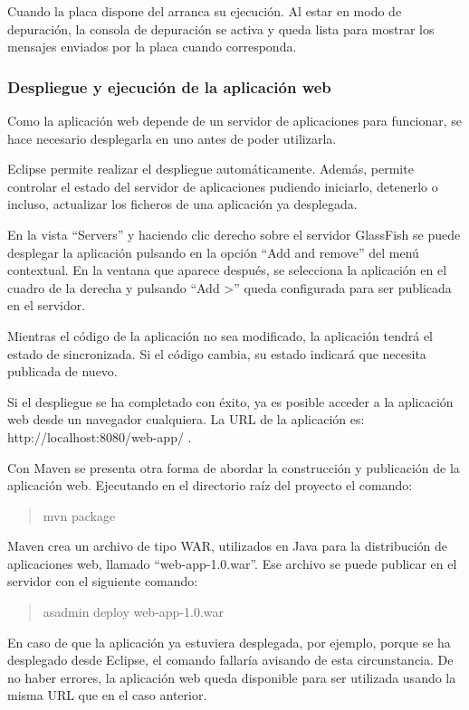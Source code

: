 Cuando la placa dispone del \sw{} arranca su ejecución. Al estar en modo de
depuración, la consola de depuración se activa y queda lista para mostrar los
mensajes enviados por la placa cuando corresponda.



\subsubsection{Despliegue y ejecución de la aplicación web} \label{sec:exe-aw}
Como la aplicación web depende de un servidor de aplicaciones para funcionar,
se hace necesario desplegarla en uno antes de poder utilizarla.

Eclipse permite realizar el despliegue automáticamente. Además, permite
controlar el estado del servidor de aplicaciones pudiendo iniciarlo, detenerlo o
incluso, actualizar los ficheros de una aplicación ya desplegada.

En la vista ``Servers'' y haciendo clic derecho sobre el servidor GlassFish
se puede desplegar la aplicación pulsando en la opción ``Add and remove'' del
menú contextual. En la ventana que aparece después, se selecciona la aplicación
en el cuadro de la derecha y pulsando ``Add >'' queda configurada para ser
publicada en el servidor.


Mientras el código de la aplicación no sea modificado, la aplicación tendrá el
estado de sincronizada. Si el código cambia, su estado indicará que necesita
publicada de nuevo.


Si el despliegue se ha completado con éxito, ya es posible acceder a la
aplicación web desde un navegador cualquiera. La URL de la aplicación es:
http://localhost:8080/web-app/ .


Con Maven se presenta otra forma de abordar la construcción y publicación de la
aplicación web. Ejecutando en el directorio raíz del proyecto el comando:
\begin{quotation}
  mvn package
\end{quotation}
Maven crea un archivo de tipo WAR, utilizados en Java para la distribución de
aplicaciones web, llamado ``web-app-1.0.war''. Ese archivo se puede publicar
en el servidor con el siguiente comando:
\begin{quotation}
  asadmin deploy web-app-1.0.war
\end{quotation}
En caso de que la aplicación ya estuviera desplegada, por ejemplo, porque se ha
desplegado desde Eclipse, el comando fallaría avisando de esta circunstancia.
De no haber errores, la aplicación web queda disponible para ser utilizada
usando la misma URL que en el caso anterior. 



